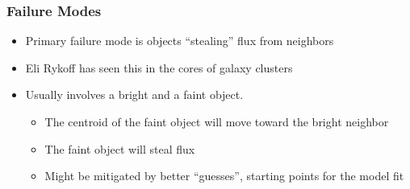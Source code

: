 \documentclass{beamer}
\begin{document}
\frame
{

    \frametitle{Failure Modes}


    \begin{itemize}

        \item Primary failure mode is objects ``stealing'' flux from neighbors

        \item Eli Rykoff has seen this in the cores of galaxy clusters

        \item Usually involves a bright and a faint object.
            \begin{itemize}
                \item The centroid of the faint object will move toward the bright neighbor
                \item The faint object will steal flux
                \item Might be mitigated by better ``guesses'', starting points for the
                    model fit
            \end{itemize}

    \end{itemize}

}
\end{document}
